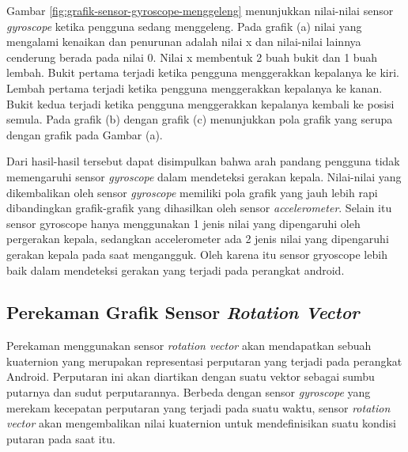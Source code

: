 Gambar \ref{fig:grafik-sensor-gyroscope-menggeleng} menunjukkan nilai-nilai sensor \textit{gyroscope} ketika pengguna sedang menggeleng. Pada grafik (a) nilai yang mengalami kenaikan dan penurunan adalah nilai x dan nilai-nilai lainnya cenderung berada pada nilai 0. Nilai x membentuk 2 buah bukit dan 1 buah lembah. Bukit pertama terjadi ketika pengguna menggerakkan kepalanya ke kiri. Lembah pertama terjadi ketika pengguna menggerakkan kepalanya ke kanan. Bukit kedua terjadi ketika pengguna menggerakkan kepalanya kembali ke posisi semula. Pada grafik (b) dengan grafik (c) menunjukkan pola grafik yang serupa dengan grafik pada Gambar (a).

Dari hasil-hasil tersebut dapat disimpulkan bahwa arah pandang pengguna tidak memengaruhi sensor \textit{gyroscope} dalam mendeteksi gerakan kepala. Nilai-nilai yang dikembalikan oleh sensor \textit{gyroscope} memiliki  pola grafik yang jauh lebih rapi dibandingkan grafik-grafik yang dihasilkan oleh sensor \textit{accelerometer}. Selain itu sensor gyroscope hanya menggunakan 1 jenis nilai yang dipengaruhi oleh pergerakan kepala, sedangkan accelerometer ada 2 jenis nilai yang dipengaruhi gerakan kepala pada saat mengangguk. Oleh karena itu sensor gryoscope lebih baik dalam mendeteksi gerakan yang terjadi pada perangkat android.

\subsection{Perekaman Grafik Sensor \textit{Rotation Vector}}
\label{sec:analisis_grafik_sensor_rotation_vector}

Perekaman menggunakan sensor \textit{rotation vector} akan mendapatkan sebuah kuaternion yang merupakan representasi perputaran yang terjadi pada perangkat Android. Perputaran ini akan diartikan dengan suatu vektor sebagai sumbu putarnya dan sudut perputarannya. Berbeda dengan sensor \textit{gyroscope} yang merekam kecepatan perputaran yang terjadi pada suatu waktu, sensor \textit{rotation vector} akan mengembalikan nilai kuaternion untuk mendefinisikan suatu kondisi putaran pada saat itu. 


